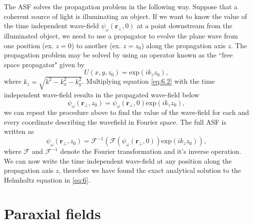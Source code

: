 \documentclass[10pt, a4paper, singlespacing]{report}
\begin{document}
The ASF solves the propagation problem in the following way. Suppose that a coherent source of light is illuminating an object. If we want to know the value of the time independent wave-field $\psi_{\omega}(\mathbf{r_{\perp}}, 0)$ at a point downstream from the illuminated object, we need to use a propagator to evolve the plane wave from one position (ex. $z = 0$) to another (ex. $z = z_0$) along the propagation axis $z$. The propagation problem may be solved by using an operator known as the ``free space propagator" given by
\begin{equation}\label{eq:6.2}
U(x, y, z_0) = \mathrm{exp} \left ( i k_z z_0 \right ),
\end{equation}
where $k_z = \sqrt{k^2 - k^{2}_{x} - k^{2}_{y}}$. Multiplying equation \ref{eq:6.2} with the time independent wave-field results in the propagated wave-field below
\begin{equation}\label{eq:6.5}
\psi_{\omega}(\mathbf{r_{\perp}}, z_0) = \psi_{\omega}(\mathbf{r_{\perp}}, 0) \mathrm{exp}(i k_z z_0), 
\end{equation}
we can repeat the procedure above to find the value of the wave-field for each and every coordinate describing the wavefield in Fourier space. The full ASF is  written as
\begin{equation}\label{eq:6.9}
\psi_{\omega}(\mathbf{r_{\perp}}, z_0) = \mathscr{F}^{-1} \left ( \mathscr{F} \left ( \psi_{\omega}(\mathbf{r_{\perp}}, 0) \right ) \mathrm{exp}(i k_z z_0) \right ), 
\end{equation}
where $\mathscr{F}$ and $\mathscr{F}^{-1}$ denote the Fourier transformation and it's inverse operation. We can now write the time independent wave-field at any position along the propagation axis $z$, therefore we have found the exact analytical solution to the Helmholtz equation in \ref{eq:6}.
\section{Paraxial fields}\label{Paraxial}
\end{document}
